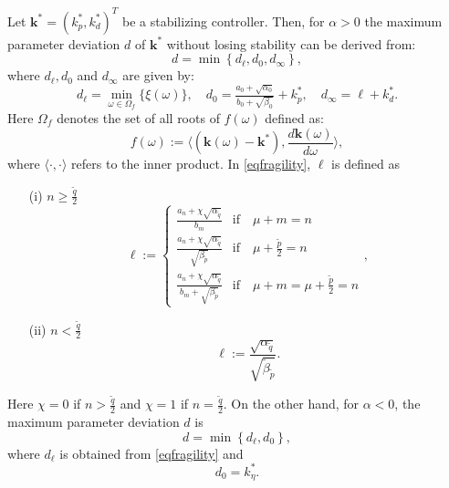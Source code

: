 \documentclass[twoside,reqno,11pt]{fcaa-var} %
\begin{document}
\begin{proposition}\label{prop:fragility}
	Let $\mathbf{k}^*=(k_p^*,k_d^*)^T$ be a stabilizing controller. Then, for $\alpha>0$ the maximum parameter deviation $d$ of $\mathbf{k}^*$ without losing stability can be derived from:
	\begin{equation}
	d=\min\left\{d_\ell,d_0,d_\infty\right\}, \label{eqdistance}
	\end{equation}
	where $d_\ell, d_0$ and $d_\infty$ are given by:
	\begin{equation}
	d_\ell=\min\limits_{\omega\in\Omega_f}\{\xi(\omega)\}, \quad d_0=\tfrac{a_0+\sqrt{\alpha_0}}{b_0+\sqrt{\beta_0}}+k_p^*,\quad d_\infty=\ell+k_d^*. \label{eqfragility}
	\end{equation}
	Here $\Omega_f$ denotes the set of all roots of $f(\omega)$ defined as:
	\begin{equation}
	f(\omega):=\langle (\mathbf{k}(\omega)-\mathbf{k}^*),\frac{d\mathbf{k}(\omega)}{d\omega}\rangle, \label{eqfCRB}
	\end{equation}
	where $\langle\cdot,\cdot\rangle$ refers to the inner product. In \eqref{eqfragility}, $\ell$ is defined as
	\begin{itemize}
		\item [(i)] $n\geq\frac{\tilde{q}}{2}$
		\begin{equation}
		\ell:=\begin{cases} \frac{a_n+\chi\sqrt{\alpha_{\tilde{q}}}}{b_m} & \text{if}\quad \mu+m=n \\
		\frac{a_n+\chi\sqrt{\alpha_{\tilde{q}}}}{\sqrt{\beta_{\tilde{p}}}} & \text{if}\quad \mu+\tfrac{\tilde{p}}{2}=n \\
		\frac{a_n+\chi\sqrt{\alpha_{\tilde{q}}}}{b_m+\sqrt{\beta_{\tilde{p}}}} & \text{if}\quad \mu+m=\mu+\tfrac{\tilde{p}}{2}=n
		\end{cases}, \label{eqFa}
		\end{equation}
		\item [(ii)] $n<\frac{\tilde{q}}{2}$
		\begin{equation}
		\ell:=\frac{\sqrt{\alpha_{\tilde{q}}}}{\sqrt{\tilde{\beta}_{\tilde{p}}}}. \label{eqFb}
		\end{equation}
	\end{itemize}
	Here $\chi=0$ if $n>\frac{\tilde{q}}{2}$ and $\chi=1$ if $n=\frac{\tilde{q}}{2}$. On the other hand, for $\alpha<0$, the maximum parameter deviation $d$ is
	\begin{equation}
	d=\min\left\{d_\ell,d_0\right\}, \label{eqdistance2}
	\end{equation}
	where $d_\ell$ is obtained from \eqref{eqfragility}  and
	\begin{equation}
	d_0=k_\eta^*. \label{eqfragility2}
	\end{equation}
\end{proposition}
\end{document}
